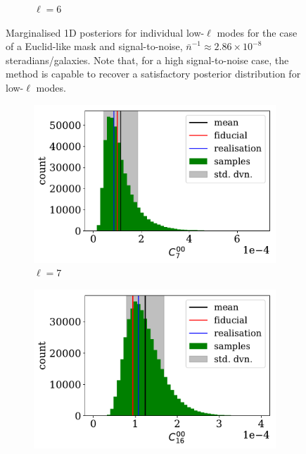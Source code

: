 \begin{figure}
\begin{center}
\begin{subfigure}{.5\textwidth}
  \caption{$\ell = 6$}
\end{subfigure}
\end{center}
\caption[Examples of marginalised 1D posteriors for individual low-$\ell$ modes for the case of a Euclid-like mask and signal-to-noise.]{Marginalised 1D posteriors for individual low-$\ell$ modes for the case of a Euclid-like mask and signal-to-noise, $\bar{n}^{-1}\approx 2.86\times 10^{-8}$ steradians/galaxies. Note that, for a high signal-to-noise case, the method is capable to recover a satisfactory posterior distribution for low-$\ell$ modes.}
\label{fig:BPL:Euclid-Ells-HighSN-LowEll}
\end{figure}


\begin{figure}
\begin{subfigure}{.5\textwidth}
  \centering
  \includegraphics[width=\textwidth]{BPL-FIGS/Euclid-LN-PNoi-N32-HDens_HISTOGRAM-ell-07.pdf}
  \caption{$\ell = 7$}
\end{subfigure}
\begin{subfigure}{.5\textwidth}
  \centering
  \includegraphics[width=\textwidth]{BPL-FIGS/Euclid-LN-PNoi-N32-HDens_HISTOGRAM-ell-16.pdf}

\end{subfigure}
\end{figure}
